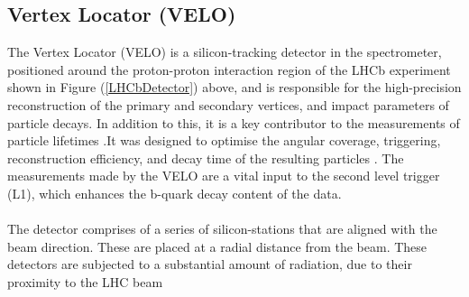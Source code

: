 \subsection{Vertex Locator (VELO)}\label{VELO}
The Vertex Locator (VELO) is a silicon-tracking detector in the spectrometer, positioned around the proton-proton interaction region of the LHCb experiment shown in Figure (\ref{LHCbDetector}) above, and is responsible for the high-precision reconstruction of the primary and secondary vertices, and impact parameters of particle decays. In addition to this, it is a key
contributor to the measurements of particle lifetimes \cite{Kopciewicz_2022}.It was designed to optimise the angular coverage, triggering, reconstruction efficiency, and decay time of the resulting particles \cite{Aaij_2014}. The measurements made by the VELO are a vital input to the second level trigger (L1), which enhances the b-quark decay content of the data.\\
\\
The detector comprises of a series of silicon-stations that are aligned with the beam direction. These are placed at a radial distance from the beam. These detectors are subjected to a substantial amount of radiation, due to their proximity to the LHC beam
